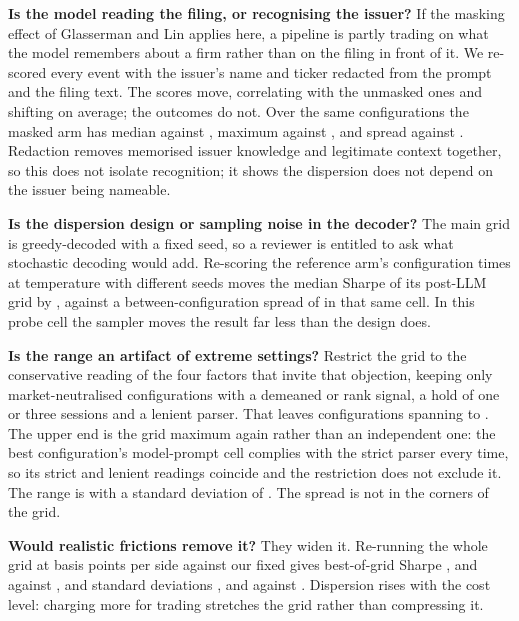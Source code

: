 \documentclass[sigconf]{acmart}
\begin{document}
\textbf{Is the model reading the filing, or recognising the issuer?} If the masking effect of
Glasserman and Lin \cite{glasserman2023assessing} applies here, a pipeline is partly trading on what
the model remembers about a firm rather than on the filing in front of it. We re-scored every event
with the issuer's name and ticker redacted from the prompt and the filing text. The scores move,
correlating \MaskCorr{} with the unmasked ones and shifting \MaskShift{} on average; the outcomes do
not. Over the same \NumPostConfigs{} configurations the masked arm has median \MaskMedian{} against
\ArmMedian{}, maximum \MaskMax{} against \ArmMax{}, and spread \MaskSD{} against \ArmSD{}.
Redaction removes memorised issuer knowledge and legitimate context together, so this does not
isolate recognition; it shows the dispersion does not depend on the issuer being nameable.

\textbf{Is the dispersion design or sampling noise in the decoder?} The main grid is greedy-decoded
with a fixed seed, so a reviewer is entitled to ask what stochastic decoding would add. Re-scoring
the reference arm's configuration \SeedCount{} times at temperature \SeedTemp{} with different seeds moves the
median Sharpe of its post-LLM grid by \SeedMedianRange{}, against a between-configuration spread of
\ArmSD{} in that same cell. In this probe cell the sampler moves the result far less than the
design does.

\textbf{Is the range an artifact of extreme settings?} Restrict the grid to the conservative
reading of the four factors that invite that objection, keeping only market-neu\-tralised
configurations with a demeaned or rank signal, a hold of one or three sessions and a lenient parser.
That leaves \PrudentConfigs{} configurations spanning \PrudentMin{} to \PrudentMax{}. The upper end
is the grid maximum again rather than an independent one: the best configuration's model-prompt cell
complies with the strict parser every time, so its strict and lenient readings coincide and the
restriction does not exclude it. The range is
\PrudentRange{} with a standard deviation of \PrudentSD{}. The spread is not in the corners of the
grid.

\textbf{Would realistic frictions remove it?} They widen it. Re-running the whole grid at
\CostLevels{} basis points per side against our fixed \CostBps{} gives best-of-grid Sharpe
\CostZeroMax{}, \CostTenMax{} and \CostTwentyfiveMax{} against \CostFiveMax{}, and standard
deviations \CostZeroSD{}, \CostTenSD{} and \CostTwentyfiveSD{} against \CostFiveSD{}. Dispersion
rises with the cost level: charging more for trading stretches the grid rather than compressing it.
\end{document}
